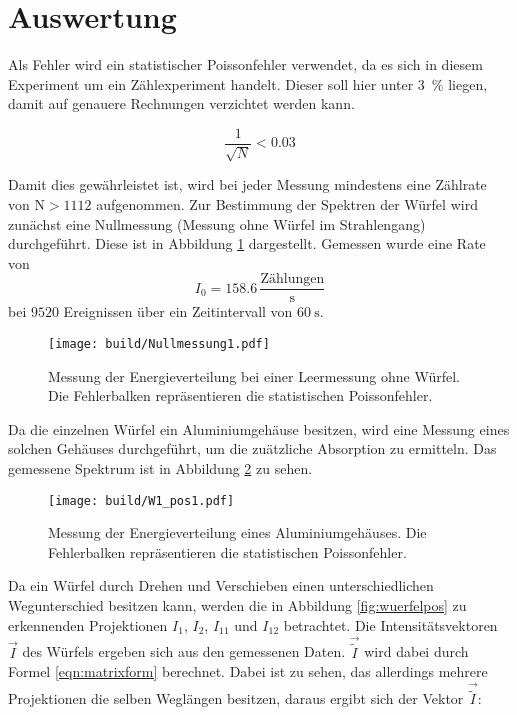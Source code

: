 \newpage
\section{Auswertung}

\label{sec:Auswertung}

Als Fehler wird ein statistischer Poissonfehler verwendet, da es sich in diesem
Experiment um ein Zählexperiment handelt. Dieser soll hier unter \SI{3}{\percent} liegen,
damit auf genauere Rechnungen verzichtet werden kann.

\begin{equation*}
  \frac{1}{\sqrt{N}} < 0.03
\end{equation*}

Damit dies gewährleistet ist, wird bei jeder Messung mindestens eine
Zählrate von $\text{N}>1112$ aufgenommen.
Zur Bestimmung der Spektren der Würfel wird zunächst eine Nullmessung (Messung
ohne Würfel im Strahlengang) durchgeführt. Diese ist in Abbildung \ref{fig:leer}
dargestellt. Gemessen wurde eine Rate von
\begin{equation*}
    I_0 = 158.6 \,\frac{\text{Zählungen}}{\text{s}}
\end{equation*}
bei $9520$ Ereignissen über ein Zeitintervall von $\SI{60}{\second}$.

\begin{figure}[htb]
  \centering
  \texttt{[image: build/Nullmessung1.pdf]}
  \caption{Messung der Energieverteilung bei einer Leermessung ohne Würfel. Die
  Fehlerbalken repräsentieren die statistischen Poissonfehler.}
  \label{fig:leer}
\end{figure}

Da die einzelnen Würfel ein Aluminiumgehäuse besitzen, wird eine Messung eines solchen
Gehäuses durchgeführt, um die zuätzliche Absorption zu ermitteln. Das gemessene Spektrum ist in
Abbildung \ref{fig:alu} zu sehen.

\begin{figure}[htb]
  \centering
  \texttt{[image: build/W1\_pos1.pdf]}
  \caption{Messung der Energieverteilung eines Aluminiumgehäuses. Die Fehlerbalken
  repräsentieren die statistischen Poissonfehler.}
  \label{fig:alu}
\end{figure}

Da ein Würfel durch Drehen und Verschieben einen unterschiedlichen Wegunterschied
besitzen kann, werden die in Abbildung \ref{fig:wuerfelpos} zu erkennenden Projektionen
$I_1$, $I_2$, $I_{11}$ und $I_{12}$ betrachtet. Die Intensitätsvektoren $\vec{I}$ des Würfels ergeben sich aus
den gemessenen Daten. $\vec{\tilde{I}}$ wird dabei durch Formel \eqref{eqn:matrixform} berechnet.
Dabei ist zu sehen, das allerdings mehrere Projektionen die selben Weglängen
besitzen, daraus ergibt sich der Vektor $\vec{\tilde{I}}$:

